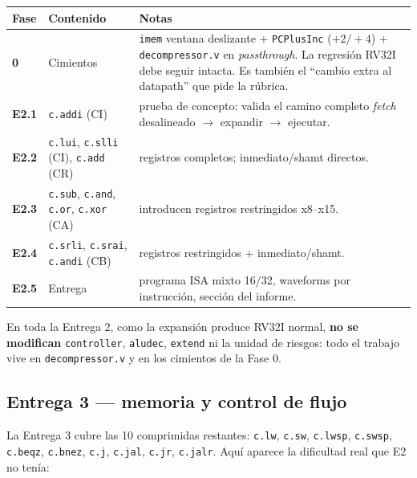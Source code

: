 \documentclass[11pt]{article}
\newcommand{\code}[1]{\texttt{#1}}
\begin{document}
\begin{center}
\small
\begin{tabular}{@{}llp{7.6cm}@{}}
\toprule
Fase & Contenido & Notas \\
\midrule
\textbf{0} & Cimientos & \code{imem} ventana deslizante + \code{PCPlusInc} ($+2/+4$) + \code{decompressor.v} en \emph{passthrough}. La regresión RV32I debe seguir intacta. Es también el ``cambio extra al datapath'' que pide la rúbrica. \\
\textbf{E2.1} & \code{c.addi} (CI) & prueba de concepto: valida el camino completo \emph{fetch} desalineado $\to$ expandir $\to$ ejecutar. \\
\textbf{E2.2} & \code{c.lui}, \code{c.slli} (CI), \code{c.add} (CR) & registros completos; inmediato/shamt directos. \\
\textbf{E2.3} & \code{c.sub}, \code{c.and}, \code{c.or}, \code{c.xor} (CA) & introducen registros restringidos x8--x15. \\
\textbf{E2.4} & \code{c.srli}, \code{c.srai}, \code{c.andi} (CB) & registros restringidos + inmediato/shamt. \\
\textbf{E2.5} & Entrega & programa ISA mixto 16/32, waveforms por instrucción, sección del informe. \\
\bottomrule
\end{tabular}
\end{center}

\noindent
En toda la Entrega 2, como la expansión produce RV32I normal, \textbf{no se
modifican} \code{controller}, \code{aludec}, \code{extend} ni la unidad de
riesgos: todo el trabajo vive en \code{decompressor.v} y en los cimientos de la
Fase 0.

\subsection{Entrega 3 --- memoria y control de flujo}

La Entrega 3 cubre las 10 comprimidas restantes:
\code{c.lw}, \code{c.sw}, \code{c.lwsp}, \code{c.swsp}, \code{c.beqz},
\code{c.bnez}, \code{c.j}, \code{c.jal}, \code{c.jr}, \code{c.jalr}. Aquí aparece
la dificultad real que E2 no tenía:
\end{document}

